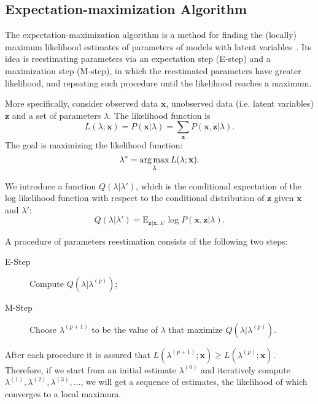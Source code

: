 \documentclass[12pt,final,twoside]{report}
\begin{document}
\subsection{Expectation-maximization Algorithm}
The expectation-maximization algorithm is a method for finding the (locally) maximum likelihood estimates of parameters of models with latent variables~\cite{dempster_maximum_1977}. Its idea is reestimating parameters via an expectation step (E-step) and a maximization step (M-step), in which the reestimated parameters have greater likelihood, and repeating such procedure until the likelihood reaches a maximum.

More specifically, consider observed data $\mathbf{x}$, unobserved data (i.e. latent variables) $\mathbf{z}$ and a set of parameters $\lambda$. The likelihood function is
\begin{equation}
  L(\lambda;\mathbf{x}) = P(\mathbf{x}|\lambda) = \sum_{\mathbf{z}} P(\mathbf{x},\mathbf{z}|\lambda) .
\end{equation}
The goal is maximizing the likelihood function:
\begin{equation}
  \lambda^* = \operatorname*{arg\,max}_\lambda L(\lambda;\mathbf{x}).
\end{equation}

We introduce a function $Q(\lambda|\lambda')$, which is the conditional expectation of the log likelihood function with respect to the conditional distribution of $\mathbf{z}$ given $\mathbf{x}$ and $\lambda'$:
\begin{equation}
  Q(\lambda|\lambda') = \text{E}_{\mathbf{z}|\mathbf{x},\lambda'} \log P(\mathbf{x},\mathbf{z}|\lambda) .
\end{equation}

A procedure of parameters reestimation consists of the following two steps:
\begin{description}
  \item[E-Step] Compute $Q(\lambda|\lambda^{(p)})$;
  \item[M-Step] Choose $\lambda^{(p+1)}$ to be the value of $\lambda$ that maximize $Q(\lambda|\lambda^{(p)})$.
\end{description}

After each procedure it is assured that $L(\lambda^{(p+1)};\mathbf{x}) \geq L(\lambda^{(p)};\mathbf{x})$. Therefore, if we start from an initial estimate $\lambda^{(0)}$ and iteratively compute $\lambda^{(1)},\lambda^{(2)},\lambda^{(3)},\dots$, we will get a sequence of estimates, the likelihood of which converges to a local maximum.
\end{document}
